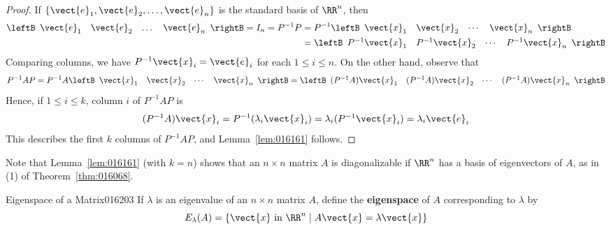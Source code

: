 \begin{proof}
If $\{\vect{e}_{1}, \vect{e}_{2}, \dots, \vect{e}_{n}\}$ is the standard basis of $\RR^n$, then
\begin{align*}
\leftB \begin{array}{cccc}
\vect{e}_1 & \vect{e}_2 & \dots & \vect{e}_n
\end{array} \rightB
= I_n = P^{-1}P 
&= P^{-1}
\leftB \begin{array}{cccc}
\vect{x}_1 & \vect{x}_2 & \cdots & \vect{x}_n
\end{array} \rightB \\
&= 
\leftB \begin{array}{cccc}
P^{-1}\vect{x}_1 & P^{-1}\vect{x}_2 & \cdots & P^{-1}\vect{x}_n
\end{array} \rightB
\end{align*}
Comparing columns, we have $P^{-1}\vect{x}_{i} = \vect{e}_{i}$ for each $1 \leq i \leq n$. On the other hand, observe that
\begin{equation*}
P^{-1}AP = P^{-1}A
\leftB \begin{array}{cccc}
	\vect{x}_1 & \vect{x}_2 & \cdots & \vect{x}_n
\end{array} \rightB
= 
\leftB \begin{array}{cccc}
	(P^{-1}A)\vect{x}_1 & (P^{-1}A)\vect{x}_2 & \cdots & (P^{-1}A)\vect{x}_n
\end{array} \rightB
\end{equation*}
Hence, if $1 \leq i \leq k$, column $i$ of $P^{-1}AP$ is
\begin{equation*}
(P^{-1}A)\vect{x}_i = P^{-1}(\lambda_i\vect{x}_i) = \lambda_i(P^{-1}\vect{x}_i) = \lambda_i\vect{e}_i
\end{equation*}
This describes the first $k$ columns of $P^{-1}AP$, and Lemma~\ref{lem:016161} follows.
\end{proof}

\noindent Note that Lemma~\ref{lem:016161} (with $k = n$) shows that an $n \times n$ matrix $A$ is diagonalizable if $\RR^n$ has a basis of eigenvectors of $A$, as in (1) of Theorem~\ref{thm:016068}.

\begin{definition}{Eigenspace of a Matrix}{016203} %
If $\lambda$ is an eigenvalue of an $n \times n$ matrix $A$, define the \textbf{eigenspace} of $A$ corresponding to $\lambda$ by
\begin{equation*}
E_{\lambda}(A) = \{\vect{x}\mbox{ in } \RR^n \mid A\vect{x} = \lambda\vect{x} \}
\end{equation*}
\end{definition}

